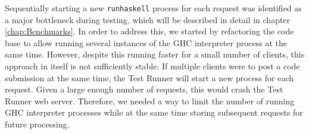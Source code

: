Sequentially starting a new \texttt{runhaskell} process for each request was identified as a major bottleneck during testing, which will be described in detail in chapter \ref{chap:Benchmarks}.
In order to address this, we started by refactoring the code base to allow running several instances of the GHC interpreter process at the same time.
However, despite this running faster for a small number of clients, this approach in itself is not sufficiently stable:
If multiple clients were to post a code submission at the same time, the Test Runner will start a new process for each request.
Given a large enough number of requests, this would crash the Test Runner web server.
Therefore, we needed a way to limit the number of running GHC interpreter processes while at the same time storing subsequent requests for future processing.